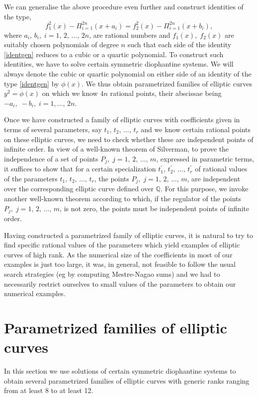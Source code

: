 \documentclass[11pt, leqno]{article}
\begin{document}
We can generalise the above procedure even further and  construct identities of the type,
\begin{equation}
f_1^2(x)-\Pi_{i=1}^{2n}(x+a_i)=f_2^2(x)-\Pi_{i=1}^{2n}(x+b_i), \label{identgen}
\end{equation}
where $a_i,\,b_i,\;i=1,\,2,\,\ldots,\,2n$, are rational numbers and $f_1(x),\;f_2(x)$ are suitably chosen polynomials of degree $n$ such that each side of the identity \eqref{identgen} reduces to a cubic or a quartic polynomial. To construct such identities, we have to solve certain symmetric diophantine systems. We will always denote the cubic or quartic polynomial on either side of an identity  of the type \eqref{identgen}  by $\phi(x)$. We thus obtain parametrized families of elliptic curves $y^2=\phi(x)$ on which we know $4n$ rational points, their abscissae being $-a_i,\;-b_i,\;i=1,\ldots,\,2n$.  
 
Once  we have constructed a  family of elliptic curves with coefficients given in terms of several parameters, say $t_1,\,t_2,\,\ldots,\,t_r$ and we know certain rational points on these elliptic curves, we need to check whether these are  independent points of infinite order. In view of a well-known theorem of Silverman, 
to prove the independence of a set of  points $P_j,\;j=1,\,2,\,\ldots,\,m$, expressed in parametric terms, it suffices to show that for a certain specialization $t_1^{\prime},\,t_2^{\prime},\,\ldots,\,t_r^{\prime}$ of rational values of the parameters $t_1,\,t_2,\,\ldots,\,t_r$, the points $P_j,\;j=1,\,2,\,\ldots,\,m$, are independent over the corresponding elliptic curve defined over $\mathbb{Q}$. For this purpose, we invoke another well-known  theorem \cite[Theorem 8.1, p. 242]{SZ} according to which,  if the regulator of the points $P_j,\;j=1,\,2,\,\ldots,\,m$, is not zero, the points must be independent points of infinite order. 

Having constructed a parametrized family of elliptic curves, it is natural to try to find specific rational values of the parameters  which yield examples of  elliptic curves of high rank. As the numerical size of the coefficients in most of our examples is just too large, it was, in general,  not feasible to follow the usual search strategies (eg by computing  Mestre-Nagao sums)  and we had  to necessarily  restrict ourselves to small values of the parameters to obtain our numerical examples. 



\section{Parametrized families of elliptic curves}
In this section  we use solutions of certain symmetric diophantine systems to  obtain several  parametrized families  of elliptic curves with generic ranks ranging from  at least 8 to at least 12. 
\end{document}
